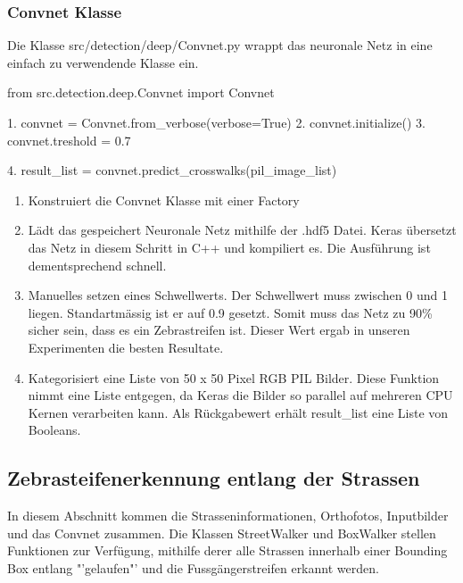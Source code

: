 \subsubsection{Convnet Klasse}
Die Klasse src/detection/deep/Convnet.py wrappt das neuronale Netz in eine einfach zu verwendende Klasse ein.
\begin{python}
	   from src.detection.deep.Convnet import Convnet
	   
	1. convnet = Convnet.from_verbose(verbose=True)
	2. convnet.initialize()
	3. convnet.treshold = 0.7
	
	4. result_list = convnet.predict_crosswalks(pil_image_list)
\end{python}
\begin{enumerate}
	\item Konstruiert die Convnet Klasse mit einer Factory
	\item Lädt das gespeichert Neuronale Netz mithilfe der .hdf5 Datei. Keras übersetzt das Netz in diesem Schritt in C++ und kompiliert es. Die Ausführung ist dementsprechend schnell.
	\item Manuelles setzen eines Schwellwerts. Der Schwellwert muss zwischen 0 und 1 liegen. Standartmässig ist er auf 0.9 gesetzt. Somit muss das Netz zu 90\% sicher sein, dass es ein Zebrastreifen ist. Dieser Wert ergab in unseren Experimenten die besten Resultate.
	\item Kategorisiert eine Liste von 50 x 50 Pixel RGB PIL Bilder. Diese Funktion nimmt eine Liste entgegen, da Keras die Bilder so parallel auf mehreren CPU Kernen verarbeiten kann. Als Rückgabewert erhält result\_list eine Liste von Booleans.
\end{enumerate}

\subsection{Zebrasteifenerkennung entlang der Strassen}
In diesem Abschnitt kommen die Strasseninformationen, Orthofotos, Inputbilder und das Convnet zusammen. Die Klassen StreetWalker und BoxWalker stellen Funktionen zur Verfügung, mithilfe derer alle Strassen innerhalb einer Bounding Box entlang "'gelaufen"' und die Fussgängerstreifen erkannt werden.

